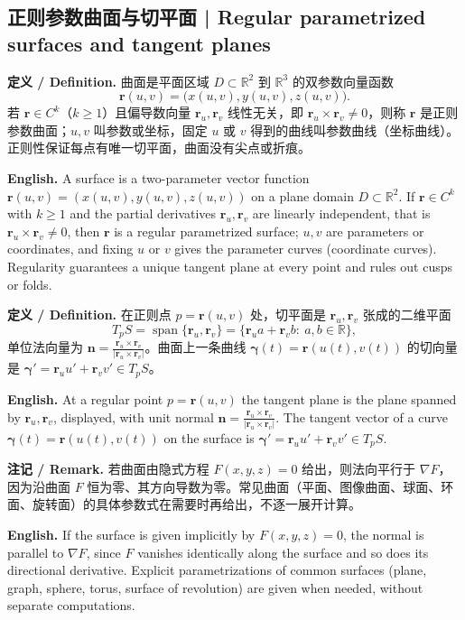 \documentclass[UTF8,11pt,a4paper]{ctexart}
\newcommand{\EN}[1]{\par\noindent \textbf{English.} #1\par}
\newcommand{\DEF}[2]{\par\noindent\textbf{定义 / Definition.} #1\par\EN{#2}\par\smallskip}
\newcommand{\REM}[2]{\par\noindent\textbf{注记 / Remark.} #1\par\EN{#2}\par\smallskip}
\newcommand{\RR}{\mathbb{R}}
\newcommand{\br}{\mathbf{r}}
\newcommand{\bn}{\mathbf{n}}
\newcommand{\bgamma}{\boldsymbol{\gamma}}
\begin{document}
\subsection{正则参数曲面与切平面 | Regular parametrized surfaces and tangent planes}
\DEF{曲面是平面区域 $D\subset\RR^2$ 到 $\RR^3$ 的双参数向量函数
\[
\br(u,v)=\bigl(x(u,v),y(u,v),z(u,v)\bigr).
\]
若 $\br\in C^k$（$k\ge1$）且偏导数向量 $\br_u,\br_v$ 线性无关，即 $\br_u\times\br_v\ne0$，则称 $\br$ 是正则参数曲面；$u,v$ 叫参数或坐标，固定 $u$ 或 $v$ 得到的曲线叫参数曲线（坐标曲线）。正则性保证每点有唯一切平面，曲面没有尖点或折痕。}{A surface is a two-parameter vector function $\br(u,v)=(x(u,v),y(u,v),z(u,v))$ on a plane domain $D\subset\RR^2$. If $\br\in C^k$ with $k\ge1$ and the partial derivatives $\br_u,\br_v$ are linearly independent, that is $\br_u\times\br_v\ne0$, then $\br$ is a regular parametrized surface; $u,v$ are parameters or coordinates, and fixing $u$ or $v$ gives the parameter curves (coordinate curves). Regularity guarantees a unique tangent plane at every point and rules out cusps or folds.}
\DEF{在正则点 $p=\br(u,v)$ 处，切平面是 $\br_u,\br_v$ 张成的二维平面
\[
T_pS=\operatorname{span}\{\br_u,\br_v\}=\{\br_u a+\br_v b:\ a,b\in\RR\},
\]
单位法向量为 $\bn=\frac{\br_u\times\br_v}{|\br_u\times\br_v|}$。曲面上一条曲线 $\bgamma(t)=\br(u(t),v(t))$ 的切向量是 $\bgamma'=\br_u u'+\br_v v'\in T_pS$。}{At a regular point $p=\br(u,v)$ the tangent plane is the plane spanned by $\br_u,\br_v$, displayed, with unit normal $\bn=\frac{\br_u\times\br_v}{|\br_u\times\br_v|}$. The tangent vector of a curve $\bgamma(t)=\br(u(t),v(t))$ on the surface is $\bgamma'=\br_u u'+\br_v v'\in T_pS$.}
\REM{若曲面由隐式方程 $F(x,y,z)=0$ 给出，则法向平行于 $\nabla F$，因为沿曲面 $F$ 恒为零、其方向导数为零。常见曲面（平面、图像曲面、球面、环面、旋转面）的具体参数式在需要时再给出，不逐一展开计算。}{If the surface is given implicitly by $F(x,y,z)=0$, the normal is parallel to $\nabla F$, since $F$ vanishes identically along the surface and so does its directional derivative. Explicit parametrizations of common surfaces (plane, graph, sphere, torus, surface of revolution) are given when needed, without separate computations.}
\end{document}

